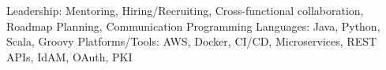 

\begin{cvskills}

  \cvskill
    {Leadership:}  
    {Mentoring, Hiring/Recruiting, Cross-functional collaboration, Roadmap Planning, Communication}
  \cvskill
    {Programming Languages:}
    {Java, Python, Scala, Groovy}    
  \cvskill
    {Platforms/Tools:}  
    {AWS, Docker, CI/CD, Microservices, REST APIs, IdAM, OAuth, PKI}

\end{cvskills}
